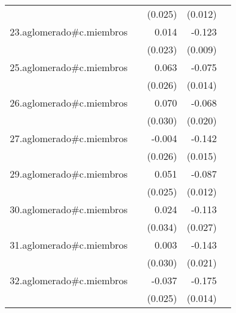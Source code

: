 {\begin{longtable}{l*{4}{D{.}{.}{-1}}}
            &                     &     (0.025)         &     (0.012)         &                     \\
\addlinespace
23.aglomerado#c.miembros&                     &       0.014         &      -0.123\sym{***}&                     \\
            &                     &     (0.023)         &     (0.009)         &                     \\
\addlinespace
25.aglomerado#c.miembros&                     &       0.063\sym{*}  &      -0.075\sym{***}&                     \\
            &                     &     (0.026)         &     (0.014)         &                     \\
\addlinespace
26.aglomerado#c.miembros&                     &       0.070\sym{*}  &      -0.068\sym{***}&                     \\
            &                     &     (0.030)         &     (0.020)         &                     \\
\addlinespace
27.aglomerado#c.miembros&                     &      -0.004         &      -0.142\sym{***}&                     \\
            &                     &     (0.026)         &     (0.015)         &                     \\
\addlinespace
29.aglomerado#c.miembros&                     &       0.051\sym{*}  &      -0.087\sym{***}&                     \\
            &                     &     (0.025)         &     (0.012)         &                     \\
\addlinespace
30.aglomerado#c.miembros&                     &       0.024         &      -0.113\sym{***}&                     \\
            &                     &     (0.034)         &     (0.027)         &                     \\
\addlinespace
31.aglomerado#c.miembros&                     &       0.003         &      -0.143\sym{***}&                     \\
            &                     &     (0.030)         &     (0.021)         &                     \\
\addlinespace
32.aglomerado#c.miembros&                     &      -0.037         &      -0.175\sym{***}&                     \\
            &                     &     (0.025)         &     (0.014)         &                     \\

\end{longtable}}
